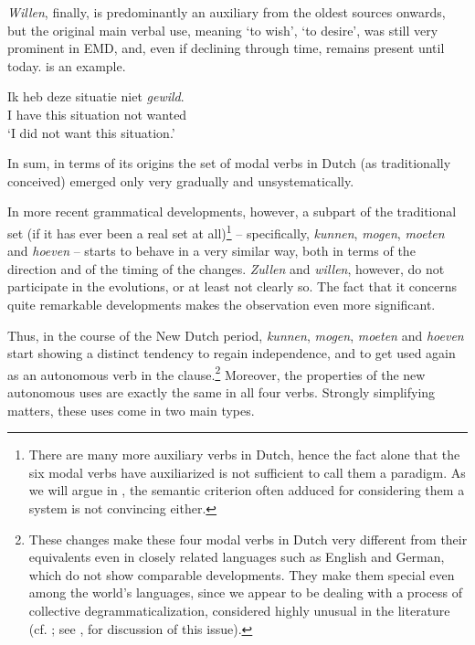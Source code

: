 \documentclass[output=paper]{langsci/langscibook}
\begin{document}
\textit{Willen}, finally, is predominantly an auxiliary from the oldest sources onwards, but the original main verbal use, meaning ‘to wish’, ‘to desire’, was still very prominent in EMD, and, even if declining through time, remains present until today.  is an example.

\ea
    \label{ex:nuyts:3}
    \gll Ik heb deze situatie niet \textit{gewild}.\\
         I have this situation not wanted \\
    \glt  `I did not want this situation.'
    \z




In sum, in terms of its origins the set of modal verbs in Dutch (as traditionally conceived) emerged only very gradually and unsystematically.

In more recent grammatical developments, however, a subpart of the traditional set (if it has ever been a real set at all)\footnote{There are many more auxiliary verbs in Dutch, hence the fact alone that the six modal verbs have auxiliarized is not sufficient to call them a paradigm. As we will argue in , the semantic criterion often adduced for considering them a system is not convincing either.}  – specifically, \textit{kunnen}, \textit{mogen}, \textit{moeten} and \textit{hoeven} – starts to behave in a very similar way, both in terms of the direction and of the timing of the changes. \textit{Zullen} and \textit{willen}, however, do not participate in the evolutions, or at least not clearly so. The fact that it concerns quite remarkable developments makes the observation even more significant.

Thus, in the course of the New Dutch period, \textit{kunnen}, \textit{mogen}, \textit{moeten} and \textit{hoeven} start showing a distinct tendency to regain independence, and to get used again as an autonomous verb in the clause.\footnote{These changes make these four modal verbs in Dutch very different from their equivalents even in closely related languages such as English and German, which do not show comparable developments. They make them special even among the world’s languages, since we appear to be dealing with a process of collective degrammaticalization, considered highly unusual in the literature (cf. \citealt{Norde2009}; see \citealt{Nuyts2013}, \citealt{CaersNuyts2021} for discussion of this issue).} Moreover, the properties of the new autonomous uses are exactly the same in all four verbs. Strongly simplifying matters, these uses come in two main types.
\end{document}
